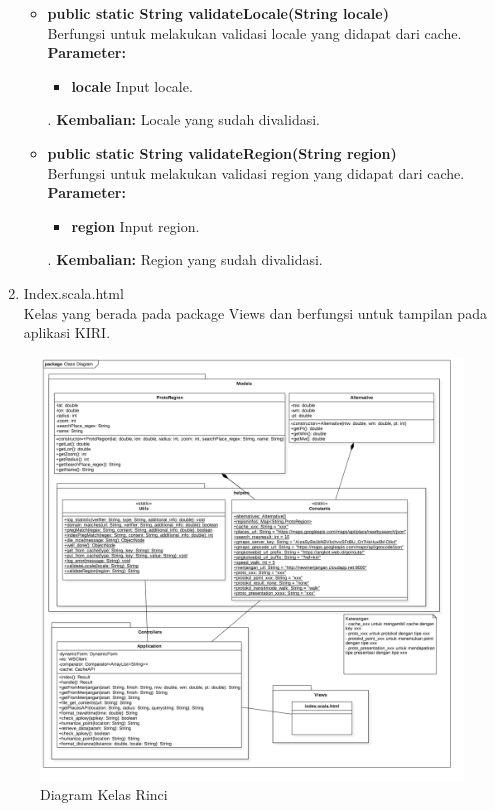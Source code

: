 \begin{enumerate}
\begin{itemize}
		\item \textbf{public static String validateLocale(String locale)}\\
		Berfungsi untuk melakukan validasi locale yang didapat dari cache.\\
		\textbf{Parameter:}
				\begin{itemize}
					\item \textbf{locale} Input locale.
				\end{itemize}.
		\textbf{Kembalian:}  Locale yang sudah divalidasi.
		
		\item \textbf{public static String validateRegion(String region)}\\
		Berfungsi untuk melakukan validasi region yang didapat dari cache.\\
		\textbf{Parameter:}
				\begin{itemize}
					\item \textbf{region} Input region.
				\end{itemize}.
		\textbf{Kembalian:}  Region yang sudah divalidasi.
		
	\end{itemize}
	
	\item Index.scala.html\\
	Kelas yang berada pada package Views dan berfungsi untuk tampilan pada aplikasi KIRI.
	
\end{enumerate}


\begin{figure}[H]
	\centering
	\includegraphics[scale=0.4]{Gambar/Class-Diagram-Rinci}
	\caption{Diagram Kelas Rinci} 
	\label{fig:4_kelas_diagram_rinci}
\end{figure}


